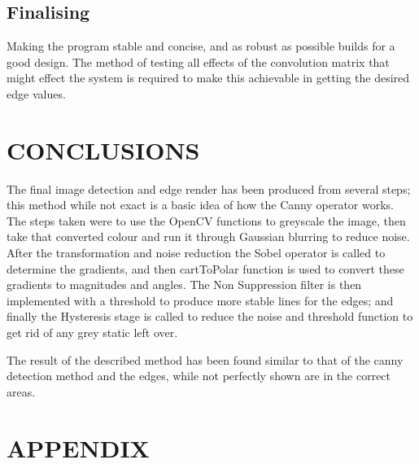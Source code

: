 \documentclass[a4paper, 10pt]{article}
\begin{document}

\subsection{Finalising}
Making the program stable and concise, and as robust as possible builds for a good design. The method of testing all effects of the convolution matrix that might effect the system is required to make this achievable in getting the desired edge values. 


\clearpage
\section{CONCLUSIONS}

The final image detection and edge render has been produced from several steps; this method while not exact is a basic idea of how the Canny operator works. The steps taken were to use the OpenCV functions to greyscale the image, then take that converted colour and run it through Gaussian blurring to reduce noise. After the transformation and noise reduction the Sobel operator is called to determine the gradients, and then cartToPolar function is used to convert these gradients to magnitudes and angles. The Non Suppression filter is then implemented with a threshold to produce more stable lines for the edges; and finally the Hysteresis stage is called to reduce the noise and threshold function to get rid of any grey static left over.

The result of the described method has been found similar to that of the canny detection method and the edges, while not perfectly shown are in the correct areas.


\nocite{*}




\clearpage
\section*{APPENDIX}
\end{document}
